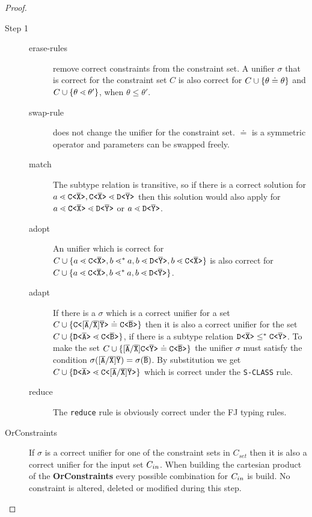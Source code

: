 \begin{proof}
\begin{description}
    \item[Step 1]
    \begin{description}
    \item[erase-rules] remove correct constraints from the constraint set.
    A unifier $\sigma$ that is correct for the constraint set $C$
    is also correct for $C \cup \{ \theta \doteq \theta \}$
    and $C \cup \{ \theta \lessdot \theta' \}$, when $\theta \leq \theta'$.
    \item[swap-rule] does not change the unifier for the constraint set.
    $\doteq$ is a symmetric operator and parameters can be swapped freely.
    \item[match] The subtype relation is transitive, so if there is a correct solution for
    $a \lessdot \mathtt{C \texttt{<} \overline{\tt X} \texttt{>} }, \mathtt{C \texttt{<} \overline{\tt X} \texttt{>} } \lessdot \mathtt{D \texttt{<} \overline{\tt Y} \texttt{>} }$
    then this solution would also apply for $a \lessdot \mathtt{C \texttt{<} \overline{\tt X} \texttt{>} } \lessdot \mathtt{D \texttt{<} \overline{\tt Y} \texttt{>} }$
    or $a \lessdot \mathtt{D \texttt{<} \overline{\tt Y} \texttt{>} }$.
    \item[adopt] An unifier which is correct for $C \cup \{ a \lessdot \mathtt{C \texttt{<} \overline{\tt X} \texttt{>} }, b \lessdot^* a, b \lessdot \mathtt{D \texttt{<} \overline{\tt Y} \texttt{>} }, b \lessdot \mathtt{C \texttt{<} \overline{\tt X} \texttt{>} } \}$
    is also correct for $C \cup \{ a \lessdot \mathtt{C \texttt{<} \overline{\tt X} \texttt{>} }, b \lessdot^* a, b \lessdot \mathtt{D \texttt{<} \overline{\tt Y} \texttt{>} } \}$.
    \item[adapt] If there is a $\sigma$ which is a correct unifier for a set
    $C \cup \{  \mathtt{C \texttt{<} [\overline{\tt A}/\overline{\tt X}]\overline{\tt Y} \texttt{>} } \doteq \mathtt{C \texttt{<} \overline{\tt B} \texttt{>} } \}$ then it is also
    a correct unifier for the set $C \cup \{  \mathtt{D \texttt{<} \overline{\tt A} \texttt{>} } \lessdot \mathtt{C \texttt{<} \overline{\tt B} \texttt{>} } \}$,
    if there is a subtype relation $\mathtt{D \texttt{<} \overline{\tt X} \texttt{>} } \leq^* \mathtt{C \texttt{<} \overline{\tt Y} \texttt{>} }$.
    To make the set $C \cup \{  [\overline{\tt A}/\overline{\tt X}]\mathtt{C \texttt{<} \overline{\tt Y} \texttt{>} } \doteq \mathtt{C \texttt{<} \overline{\tt B} \texttt{>} } \}$ the unifier 
    $\sigma$ must satisfy the condition $\sigma([\overline{\tt A}/\overline{\tt X}]\overline{\tt Y}) = \sigma(\overline{\tt B})$.
    By substitution we get $C \cup \{  \mathtt{D \texttt{<} \overline{\tt A} \texttt{>} } \lessdot \mathtt{C \texttt{<} [\overline{\tt A}/\overline{\tt X}]\overline{\tt Y} \texttt{>} } \}$
    which is correct under the \texttt{S-CLASS} rule.
    \item[reduce] The \texttt{reduce} rule is obviously correct under the FJ typing rules.
    \end{description}
    
    \item[OrConstraints]
    If $\sigma$ is a correct unifier for one of the constraint sets in $C_{set}$
    then it is also a correct unifier for the input set $C_{in}$.
    When building the cartesian product of the \textbf{OrConstraints} every possible
    combination for $C_{in}$ is build.
    No constraint is altered, deleted or modified during this step.
    \end{description}
    \end{proof}
    
